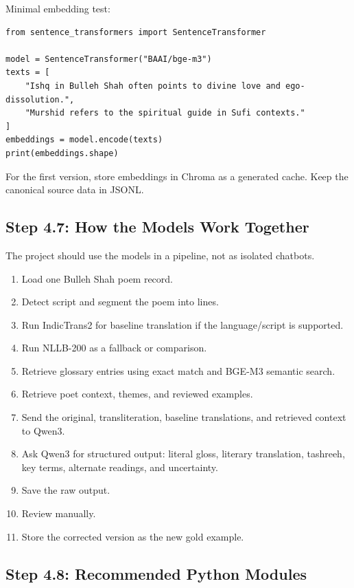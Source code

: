 \documentclass[11pt]{article}
\begin{document}
Minimal embedding test:

\begin{verbatim}
from sentence_transformers import SentenceTransformer

model = SentenceTransformer("BAAI/bge-m3")
texts = [
    "Ishq in Bulleh Shah often points to divine love and ego-dissolution.",
    "Murshid refers to the spiritual guide in Sufi contexts."
]
embeddings = model.encode(texts)
print(embeddings.shape)
\end{verbatim}

For the first version, store embeddings in Chroma as a generated cache. Keep the
canonical source data in JSONL.

\subsection{Step 4.7: How the Models Work Together}

The project should use the models in a pipeline, not as isolated chatbots.

\begin{enumerate}
  \item Load one Bulleh Shah poem record.
  \item Detect script and segment the poem into lines.
  \item Run IndicTrans2 for baseline translation if the language/script is
  supported.
  \item Run NLLB-200 as a fallback or comparison.
  \item Retrieve glossary entries using exact match and BGE-M3 semantic search.
  \item Retrieve poet context, themes, and reviewed examples.
  \item Send the original, transliteration, baseline translations, and retrieved
  context to Qwen3.
  \item Ask Qwen3 for structured output: literal gloss, literary translation,
  tashreeh, key terms, alternate readings, and uncertainty.
  \item Save the raw output.
  \item Review manually.
  \item Store the corrected version as the new gold example.
\end{enumerate}

\subsection{Step 4.8: Recommended Python Modules}
\end{document}
